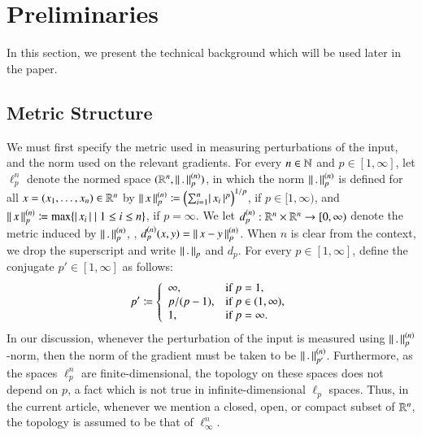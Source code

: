 \documentclass[11pt,times]{article}
\begin{document}
\section{Preliminaries}
\label{sec:preliminaries}




In this section, we present the technical background which will be
used later in the paper.


\subsection{Metric Structure}
\label{sec:metric_structure}

We must first specify the metric used in measuring perturbations of
the input, and the norm used on the relevant gradients. For every
$n \in \mathbb{N}$ and $p \in [1,\infty]$, let $\ell_p^n$ denote the normed
space $(\mathbb{R}^n, {\left\lVert\thinspace {.} \thinspace \right\rVert}^{(n)}_p)$, in which the norm ${\left\lVert\thinspace {.} \thinspace \right\rVert}^{(n)}_p$
is defined for all $x = (x_1, \ldots, x_n) \in \mathbb{R}^n$ by
${\left\lVert\thinspace {x} \thinspace \right\rVert}^{(n)}_p \coloneqq \left( \sum_{i=1}^{n} \lvert\thinspace {x_i} \thinspace\rvert^p
\right)^{1/p}$, if $ p \in [1, \infty)$, and
${\left\lVert\thinspace {x} \thinspace \right\rVert}^{(n)}_p \coloneqq \max \{{\lvert\thinspace {x_i} \thinspace\rvert} \mid { 1 \leq i \leq
  n}\}$, if $p = \infty$. We let
$d_p^{(n)} : \mathbb{R}^n \times \mathbb{R}^n \to [0,\infty)$ denote the metric
induced by ${\left\lVert\thinspace {.} \thinspace \right\rVert}^{(n)}_p$, {\ie},
$d_p^{(n)}(x,y) = {\left\lVert\thinspace {x-y} \thinspace \right\rVert}^{(n)}_p$. When $n$ is clear from the
context, we drop the superscript and write ${\left\lVert\thinspace {.} \thinspace \right\rVert}_p$ and $d_p$. For
every $p \in [1,\infty]$, define the conjugate $p' \in [1,\infty]$ as
follows:
%
\begin{equation}
  \label{eq:p_prime_conj}
  p' \coloneqq \left\{
      \begin{array}{ll}
        \infty, & \text{if } p = 1,\\
        p/(p-1), & \text{if } p \in (1,\infty), \\
        1, & \text{if } p = \infty.\\        
      \end{array}
      \right.
\end{equation}
%
\noindent
In our discussion, whenever the perturbation of the input is measured
using ${\left\lVert\thinspace {.} \thinspace \right\rVert}^{(n)}_p$-norm, then the norm of the gradient must be
taken to be ${\left\lVert\thinspace {.} \thinspace \right\rVert}^{(n)}_{p'}$. Furthermore, as the spaces
$\ell^n_p$ are finite-dimensional, the topology on these spaces does
not depend on $p$, a fact which is not true in infinite-dimensional
$\ell_p$ spaces. Thus, in the current article, whenever we mention a
closed, open, or compact subset of $\mathbb{R}^n$, the topology is assumed to
be that of $\ell^n_\infty$.
\end{document}
